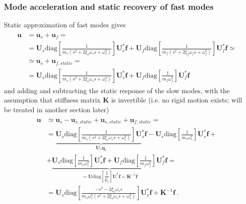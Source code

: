 \documentclass[letterpaper,10pt,english]{jupyterBook}
\begin{document}
\subsubsection{Mode acceleration and static recovery of fast modes}
\label{\detokenize{ch/solids/small-displacements-numerics:mode-acceleration-and-static-recovery-of-fast-modes}}
\sphinxAtStartPar
Static approximation of fast modes gives
\begin{equation*}
\begin{split}\begin{aligned}
  \mathbf{u} 
  & = \mathbf{u}_s + \mathbf{u}_f = \\
  & = \mathbf{U}_s \text{diag}\left[ \frac{1}{m_s ( s^2 + 2 \xi_s \omega_s s + \omega^2_s )} \right] \mathbf{U}_s^* \mathbf{f} 
    + \mathbf{U}_f \text{diag}\left[ \frac{1}{m_f ( s^2 + 2 \xi_f \omega_f s + \omega^2_f )} \right] \mathbf{U}_f^* \mathbf{f} \simeq \\
  & \simeq \mathbf{u}_s + \mathbf{u}_{f,static} = \\
  & = \mathbf{U}_s \text{diag}\left[ \frac{1}{m_s ( s^2 + 2 \xi_s \omega_s s + \omega^2_s )} \right] \mathbf{U}_s^* \mathbf{f} 
    + \mathbf{U}_f \text{diag}\left[ \frac{1}{m_f \omega^2_f } \right] \mathbf{U}_f^* \mathbf{f}
\end{aligned}\end{split}
\end{equation*}
\sphinxAtStartPar
and adding and subtracting the static response of the slow modes, with the assumption that stiffness matrix \(\mathbf{K}\) is invertible (i.e. no rigid motion exists; {\hyperref[\detokenize{ch/solids/small-displacements-numerics:solid-mechanics-intro-small-displacements-numerics-rigid}]{}} will be treated in another section later)
\begin{equation*}
\begin{split}\begin{aligned}
  \mathbf{u}
  & \simeq \mathbf{u}_s - \mathbf{u}_{s,static} + \mathbf{u}_{s,static} + \mathbf{u}_{f,static} = \\
  & = \underbrace{\mathbf{U}_s \text{diag}\left[ \frac{1}{m_s ( s^2 + 2 \xi_s \omega_s s + \omega^2_s )} \right] \mathbf{U}_s^* \mathbf{f}}_{\mathbf{U}_s \mathbf{q}_s}
    - \mathbf{U}_s \text{diag}\left[ \frac{1}{m_s \omega^2_s } \right] \mathbf{U}_s^* \mathbf{f} + \\
  & + \underbrace{\mathbf{U}_s \text{diag}\left[ \frac{1}{m_s \omega^2_s } \right] \mathbf{U}_s^* \mathbf{f}
    + \mathbf{U}_f \text{diag}\left[ \frac{1}{m_f \omega^2_f } \right] \mathbf{U}_f^* \mathbf{f}}_{= \mathbf{U} \text{diag}\left[ \dfrac{1}{k_i} \right] \mathbf{U}^* \mathbf{f} = \mathbf{K}^{-1} \mathbf{f}} = \\
  & = \mathbf{U}_s \text{diag}\left[ \frac{-s^2- 2 \xi_s \omega_s s}{m_s \omega_s^2 ( s^2 + 2 \xi_s \omega_s s + \omega^2_s )} \right] \mathbf{U}_s^* \mathbf{f} + \mathbf{K}^{-1} \mathbf{f} \ .
\end{aligned}\end{split}
\end{equation*}
\end{document}
